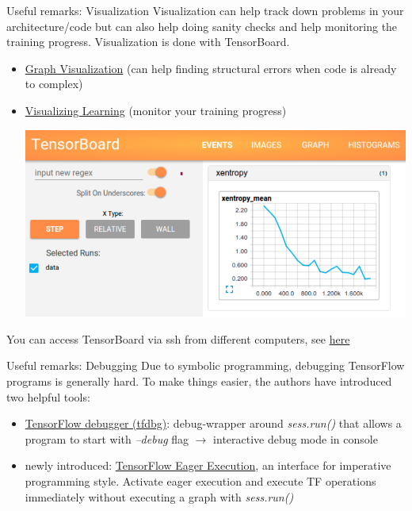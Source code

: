 \documentclass[18pt]{beamer}
\begin{document}
\begin{frame}{Useful remarks: Visualization}
Visualization can help track down problems in your architecture/code but can also help doing sanity checks and help monitoring the training progress. Visualization is done with TensorBoard. \\[8pt]
\begin{itemize}
\item \textcolor{kitgreen}{ \href{https://www.tensorflow.org/get_started/graph_viz}{Graph Visualization}} (can help finding structural errors when code is already to complex)
\item \textcolor{kitgreen}{ \href{https://www.tensorflow.org/get_started/summaries_and_tensorboard}{Visualizing Learning}} (monitor your training progress)

\begin{center}
\includegraphics[scale=0.2]{figures/tensorboard.png}
\end{center}
\end{itemize}
You can access TensorBoard via ssh from different computers, see \textcolor{kitgreen}{ \href{https://github.com/jonasrothfuss/DeepEpisodicMemory/blob/master/commands.md}{here}}
\end{frame}


\begin{frame}{Useful remarks: Debugging}
Due to symbolic programming, debugging TensorFlow programs is generally hard. To make things easier, the authors have introduced two helpful tools:\\[8pt]
\begin{itemize}
\item \textcolor{kitgreen}{ \href{https://www.tensorflow.org/programmers_guide/debugger}{TensorFlow debugger (tfdbg)}}: debug-wrapper around \emph{sess.run()} that allows a program to start with \emph{--debug} flag $\rightarrow$ interactive debug mode in console
\item newly introduced: \textcolor{kitgreen}{ \href{https://github.com/tensorflow/tensorflow/blob/master/tensorflow/contrib/eager/README.md}{TensorFlow Eager Execution}}, an interface for imperative programming style. Activate eager execution and execute TF operations immediately without executing a graph with \emph{sess.run()}
\end{itemize}
\end{frame}
\end{document}
